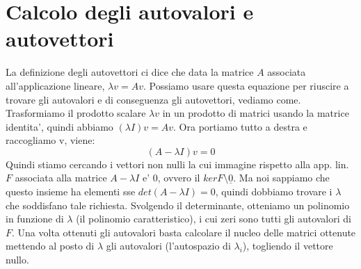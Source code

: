 \documentclass{report}
\begin{document}
\section{Calcolo degli autovalori e autovettori}
La definizione degli autovettori ci dice che data la matrice $ A $ associata all'applicazione lineare, $ \lambda v = Av $. Possiamo usare questa equazione per riuscire a trovare gli autovalori e di conseguenza gli autovettori, vediamo come. Trasformiamo il prodotto scalare $ \lambda v $ in un prodotto di matrici usando la matrice identita', quindi abbiamo $ (\lambda I)v = Av $. Ora portiamo tutto a destra e raccogliamo v, viene:
\[
  (A-\lambda I)v = 0
\]
Quindi stiamo cercando i vettori non nulli la cui immagine rispetto alla app. lin. $ F $ associata alla matrice $ A-\lambda I $ e' $ 0 $, ovvero il $ kerF \setminus \underline{0} $. Ma noi sappiamo che questo insieme ha elementi sse $ det(A-\lambda I) = 0 $, quindi dobbiamo trovare i $ \lambda $ che soddisfano tale richiesta. Svolgendo il determinante, otteniamo un polinomio in funzione di $ \lambda $ (il polinomio caratteristico), i cui zeri sono tutti gli autovalori di $ F $. Una volta ottenuti gli autovalori basta calcolare il nucleo delle matrici ottenute mettendo al posto di $ \lambda $ gli autovalori (l'autospazio di $ \lambda_i $), togliendo il vettore nullo.



\end{document}
